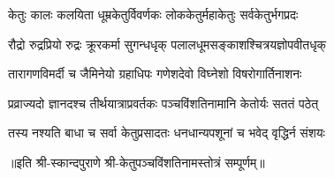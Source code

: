 

\twolineshloka
{केतुः कालः कलयिता धूम्रकेतुर्विवर्णकः}
{लोककेतुर्महाकेतुः सर्वकेतुर्भगप्रदः}

\twolineshloka
{रौद्रो रुद्रप्रियो रुद्रः क्रूरकर्मा सुगन्धधृक्}
{पलालधूमसङ्काशश्चित्रयज्ञोपवीतधृक्}

\twolineshloka
{तारागणविमर्दी च जैमिनेयो ग्रहाधिपः}
{गणेशदेवो विघ्नेशो विषरोगार्तिनाशनः}

\twolineshloka
{प्रव्राज्यदो ज्ञानदश्च तीर्थयात्राप्रवर्तकः}
{पञ्चविंशतिनामानि केतोर्यः सततं पठेत्}

\twolineshloka
{तस्य नश्यति बाधा च सर्वा केतुप्रसादतः}
{धनधान्यपशूनां च भवेद् वृद्धिर्न संशयः}

॥इति श्री-स्कान्दपुराणे श्री-केतुपञ्चविंशतिनामस्तोत्रं सम्पूर्णम्॥


